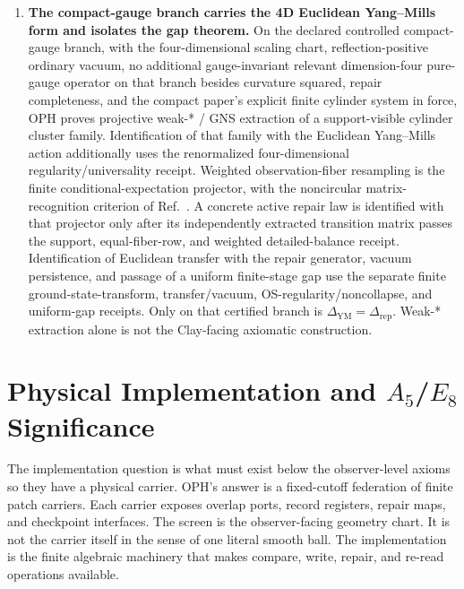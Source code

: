 \documentclass[11pt]{article}
\begin{document}
\begin{enumerate}[leftmargin=2em]
compact-gauge repair-gap theorem. The string-vacuum selector uses this bridge only as the
effective edge-language input; critical worldsheet closure, Bouchard-Donagi cohomology,
operator-safety realization, threshold matching, and moduli locking are separate gates.
\item \textbf{The compact-gauge branch carries the 4D Euclidean Yang--Mills form and isolates the
gap theorem.} On the declared controlled compact-gauge branch, with the four-dimensional
scaling chart, reflection-positive ordinary vacuum, no additional gauge-invariant relevant
dimension-four pure-gauge operator on that branch besides curvature squared, repair completeness,
and the compact paper's explicit finite cylinder system in force, OPH proves projective weak-* /
GNS extraction of a support-visible cylinder cluster family. Identification of that family with
the Euclidean Yang--Mills action additionally uses the renormalized four-dimensional
regularity/universality receipt. Weighted observation-fiber resampling is the finite
conditional-expectation projector, with the noncircular matrix-recognition criterion of
Ref.~\cite{observableNormalForms}. A concrete active repair law is identified with that projector
only after its independently extracted transition matrix passes the support, equal-fiber-row, and
weighted detailed-balance receipt. Identification of Euclidean transfer with the repair generator,
vacuum persistence, and passage of a uniform finite-stage gap use the separate finite
ground-state-transform, transfer/vacuum, OS-regularity/noncollapse, and uniform-gap receipts.
Only on that certified branch is
\(\Delta_{\mathrm{YM}}=\Delta_{\mathrm{rep}}\). Weak-* extraction alone is not the
Clay-facing axiomatic construction.
\end{enumerate}

\section{Physical Implementation and \(A_5\)/\(E_8\) Significance}

The implementation question is what must exist below the observer-level axioms so they have a
physical carrier. OPH's answer is a fixed-cutoff federation of finite patch carriers. Each carrier
exposes overlap ports, record registers, repair maps, and checkpoint interfaces. The screen is the
observer-facing geometry chart. It is not the carrier itself in the sense of one literal smooth ball.
The implementation is the finite algebraic machinery that makes compare, write, repair, and re-read
operations available.
\end{document}
